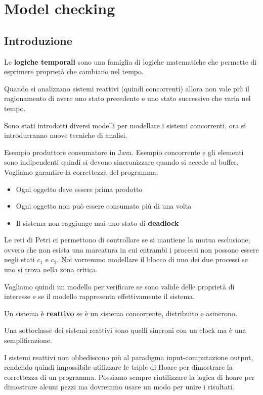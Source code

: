 \chapter{Model checking}
\section{Introduzione}
Le \textbf{logiche temporali} sono una famiglia di logiche matematiche che
permette di esprimere proprietà che cambiano nel tempo.

Quando si analizzano sistemi reattivi (quindi concorrenti) allora non vale più
il ragionamento di avere uno stato precedente e uno stato successivo che varia nel
tempo.

Sono stati introdotti diversi modelli per modellare i sistemi concorrenti, ora
si introdurranno nuove tecniche di analisi.

Esempio produttore consumatore in Java. Esempio concorrente e gli elementi sono
indipendenti quindi si devono sincronizzare quando si accede al buffer. Vogliamo
garantire la correttezza del programma:
\begin{itemize}
    \item Ogni oggetto deve essere prima prodotto
    \item Ogni oggetto non può essere consumato più di una volta
    \item Il sistema non raggiunge mai uno stato di \textbf{deadlock}
\end{itemize}
Le reti di Petri ci permettono di controllare se si mantiene la mutua esclusione,
ovvero che non esista una  marcatura in cui entrambi i processi non possono essere
negli stati $c_1$ e $c_2$. Noi vorremmo modellare il blocco di uno dei due
processi se uno si trova nella zona critica.

Vogliamo quindi un modello per verificare se sono valide delle proprietà di
interesse e se il modello rappresenta effettivamente il sistema.
\begin{definizione}
    Un sistema è \textbf{reattivo} se è un sistema concorrente, distribuito e
    asincrono.
\end{definizione}
Una sottoclasse dei sistemi reattivi sono quelli sincroni con un clock ma è una
semplificazione.

I sistemi reattivi non obbediscono più al paradigma input-computazione output,
rendendo quindi impossibile utilizzare le triple di Hoare per dimostrare la
correttezza di un programma. Possiamo sempre riutilizzare la logica di hoare per
dimostrare alcuni pezzi ma dovremmo usare un modo per unire i risultati.

